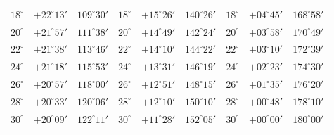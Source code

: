 \begin{table}[!h]
\begin{tabular}{ccc|ccc|ccc}
$18^\circ$ & $+22^\circ13'$ & $109^\circ30'$ & $18^\circ$ & $+15^\circ26'$ & $140^\circ26'$ & $18^\circ$ & $+04^\circ45'$ & $168^\circ58'$\\
$20^\circ$ & $+21^\circ57'$ & $111^\circ38'$ & $20^\circ$ & $+14^\circ49'$ & $142^\circ24'$ & $20^\circ$ & $+03^\circ58'$ & $170^\circ49'$\\
$22^\circ$ & $+21^\circ38'$ & $113^\circ46'$ & $22^\circ$ & $+14^\circ10'$ & $144^\circ22'$ & $22^\circ$ & $+03^\circ10'$ & $172^\circ39'$\\
$24^\circ$ & $+21^\circ18'$ & $115^\circ53'$ & $24^\circ$ & $+13^\circ31'$ & $146^\circ19'$ & $24^\circ$ & $+02^\circ23'$ & $174^\circ30'$\\
$26^\circ$ & $+20^\circ57'$ & $118^\circ00'$ & $26^\circ$ & $+12^\circ51'$ & $148^\circ15'$ & $26^\circ$ & $+01^\circ35'$ & $176^\circ20'$\\
$28^\circ$ & $+20^\circ33'$ & $120^\circ06'$ & $28^\circ$ & $+12^\circ10'$ & $150^\circ10'$ & $28^\circ$ & $+00^\circ48'$ & $178^\circ10'$\\
$30^\circ$ & $+20^\circ09'$ & $122^\circ11'$ & $30^\circ$ & $+11^\circ28'$ & $152^\circ05'$ & $30^\circ$ & $+00^\circ00'$ & $180^\circ00'$\\
\end{tabular}
\end{table}

